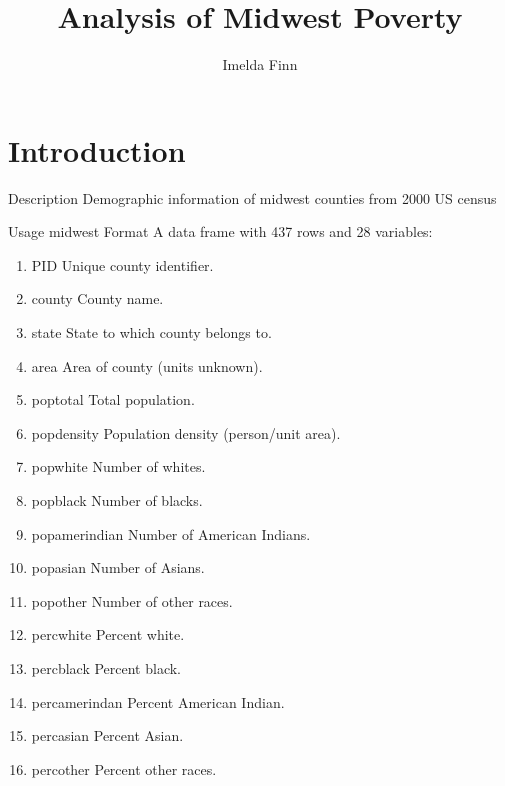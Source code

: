 \documentclass[12pt,a4paper]{article}
\author{Imelda Finn}
\title{Analysis of Midwest Poverty}
\begin{document}
	\maketitle
	
\section*{Introduction}
Description
Demographic information of midwest counties from 2000 US census

Usage
midwest
Format
A data frame with 437 rows and 28 variables:


\begin{enumerate}

\item PID
Unique county identifier.

\item county
County name.

\item state
State to which county belongs to.

\item area
Area of county (units unknown).

\item poptotal
Total population.

\item popdensity
Population density (person/unit area).

\item popwhite
Number of whites.

\item popblack
Number of blacks.

\item popamerindian
Number of American Indians.

\item popasian
Number of Asians.

\item popother
Number of other races.

\item percwhite
Percent white.

\item percblack
Percent black.

\item percamerindan
Percent American Indian.

\item percasian
Percent Asian.

\item percother
Percent other races.


\end{enumerate}
\end{document}
